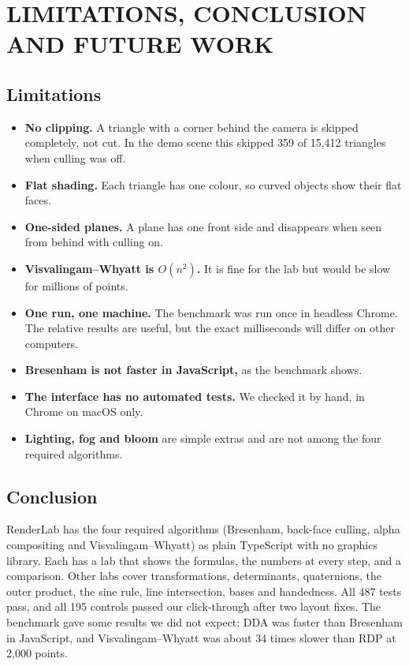 \chapter{LIMITATIONS, CONCLUSION AND FUTURE WORK}\nonum

\section{Limitations}
\begin{itemize}
\item \textbf{No clipping.} A triangle with a corner behind the camera is skipped completely, not cut. In the demo scene this skipped 359 of 15,412 triangles when culling was off.
\item \textbf{Flat shading.} Each triangle has one colour, so curved objects show their flat faces.
\item \textbf{One-sided planes.} A plane has one front side and disappears when seen from behind with culling on.
\item \textbf{Visvalingam--Whyatt is $O(n^2)$.} It is fine for the lab but would be slow for millions of points.
\item \textbf{One run, one machine.} The benchmark was run once in headless Chrome. The relative results are useful, but the exact milliseconds will differ on other computers.
\item \textbf{Bresenham is not faster in JavaScript,} as the benchmark shows.
\item \textbf{The interface has no automated tests.} We checked it by hand, in Chrome on macOS only.
\item \textbf{Lighting, fog and bloom} are simple extras and are not among the four required algorithms.
\end{itemize}

\section{Conclusion}
RenderLab has the four required algorithms (Bresenham, back-face culling, alpha compositing and Visvalingam--Whyatt) as plain TypeScript with no graphics library. Each has a lab that shows the formulas, the numbers at every step, and a comparison. Other labs cover transformations, determinants, quaternions, the outer product, the sine rule, line intersection, bases and handedness. All 487 tests pass, and all 195 controls passed our click-through after two layout fixes. The benchmark gave some results we did not expect: DDA was faster than Bresenham in JavaScript, and Visvalingam--Whyatt was about 34 times slower than RDP at 2,000 points.

